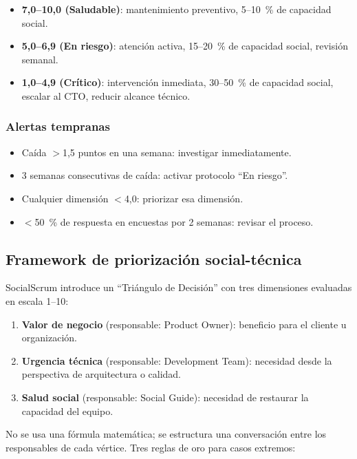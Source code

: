 \begin{itemize}
    \item \textbf{7,0--10,0 (Saludable)}: mantenimiento preventivo, 5--10~\% de capacidad social.
    \item \textbf{5,0--6,9 (En riesgo)}: atención activa, 15--20~\% de capacidad social, revisión semanal.
    \item \textbf{1,0--4,9 (Crítico)}: intervención inmediata, 30--50~\% de capacidad social, escalar al CTO, reducir alcance técnico.
\end{itemize}

\subsubsection{Alertas tempranas}

\begin{itemize}
    \item Caída $>$1,5 puntos en una semana: investigar inmediatamente.
    \item 3 semanas consecutivas de caída: activar protocolo ``En riesgo''.
    \item Cualquier dimensión $<$4,0: priorizar esa dimensión.
    \item $<$50~\% de respuesta en encuestas por 2 semanas: revisar el proceso.
\end{itemize}

\subsection{Framework de priorización social-técnica}

SocialScrum introduce un ``Triángulo de Decisión'' con tres dimensiones evaluadas en escala 1--10:

\begin{enumerate}
    \item \textbf{Valor de negocio} (responsable: Product Owner): beneficio para el cliente u organización.
    \item \textbf{Urgencia técnica} (responsable: Development Team): necesidad desde la perspectiva de arquitectura o calidad.
    \item \textbf{Salud social} (responsable: Social Guide): necesidad de restaurar la capacidad del equipo.
\end{enumerate}

No se usa una fórmula matemática; se estructura una conversación entre los responsables de cada vértice. Tres reglas de oro para casos extremos:

